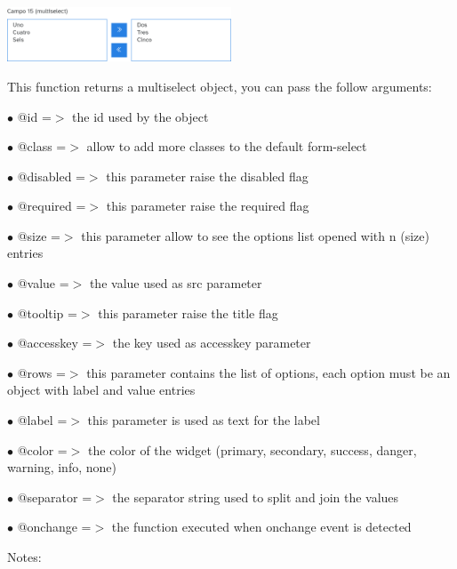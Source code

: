 \documentclass[a4paper]{article}
\begin{document}
\begin{center}\includegraphics[width=0.5\textwidth]{../ujest/snaps/test-bootstrap-js-bootstrap-campo-15-multiselect-1-snap.png}\end{center}

This function returns a multiselect object, you can pass the follow arguments:

\begin{compactitem}
\item[\color{myblue}$\bullet$] @id        =$>$ the id used by the object
\item[\color{myblue}$\bullet$] @class     =$>$ allow to add more classes to the default form-select
\item[\color{myblue}$\bullet$] @disabled  =$>$ this parameter raise the disabled flag
\item[\color{myblue}$\bullet$] @required  =$>$ this parameter raise the required flag
\item[\color{myblue}$\bullet$] @size      =$>$ this parameter allow to see the options list opened with n (size) entries
\item[\color{myblue}$\bullet$] @value     =$>$ the value used as src parameter
\item[\color{myblue}$\bullet$] @tooltip   =$>$ this parameter raise the title flag
\item[\color{myblue}$\bullet$] @accesskey =$>$ the key used as accesskey parameter
\item[\color{myblue}$\bullet$] @rows      =$>$ this parameter contains the list of options, each option must be an object
              with label and value entries
\item[\color{myblue}$\bullet$] @label     =$>$ this parameter is used as text for the label
\item[\color{myblue}$\bullet$] @color     =$>$ the color of the widget (primary, secondary, success, danger, warning, info, none)
\item[\color{myblue}$\bullet$] @separator =$>$ the separator string used to split and join the values
\item[\color{myblue}$\bullet$] @onchange  =$>$ the function executed when onchange event is detected
\end{compactitem}

Notes:
\end{document}
